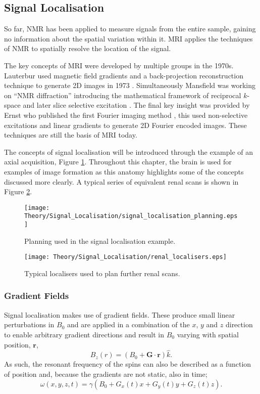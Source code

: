 \subsection{Signal Localisation}
So far, \ac{NMR} has been applied to measure signals from the entire sample, gaining no information about the spatial variation within it. \ac{MRI} applies the techniques of \ac{NMR} to spatially resolve the location of the signal.

The key concepts of \ac{MRI} were developed by multiple groups in the 1970s. Lauterbur used magnetic field gradients and a back-projection reconstruction technique to generate 2D images in 1973 \cite{lauterbur_image_1973}. Simultaneously Mansfield was working on ``\ac{NMR} diffraction'' introducing the mathematical framework of reciprocal $k$-space \cite{mansfield_nmr_1973} and later slice selective excitation \cite{garroway_image_1974}. The final key insight was provided by Ernst who published the first Fourier imaging method \cite{kumar_nmr_1975}, this used non-selective excitations and linear gradients to generate 2D Fourier encoded images. These techniques are still the basis of \ac{MRI} today.

The concepts of signal localisation will be introduced through the example of an axial acquisition, Figure \ref{fig:theory_axial_planning}. Throughout this chapter, the brain is used for examples of image formation as this anatomy highlights some of the concepts discussed more clearly. A typical series of equivalent renal scans is shown in Figure \ref{fig:theory_renal_localisers}.
\begin{figure}[H]
	\centering
	\texttt{[image: Theory/Signal\_Localisation/signal\_localisation\_planning.eps]}
	\caption{Planning used in the signal localisation example.}
	\label{fig:theory_axial_planning}	
\end{figure}

\begin{figure}[H]
	\centering
	\texttt{[image: Theory/Signal\_Localisation/renal\_localisers.eps]}
	\caption{Typical localisers used to plan further renal scans.}
	\label{fig:theory_renal_localisers}	
\end{figure}
\subsubsection{Gradient Fields}
Signal localisation makes use of gradient fields. These produce small linear perturbations in $B_0$ and are applied in a combination of the $x$, $y$ and $z$ direction to enable arbitrary gradient directions and result in $B_0$ varying with spatial position, $\mathbf{r}$,
\begin{equation}
B_z\left( r\right) =\left( B_0 + \mathbf{G \cdot r}\right) \hat{k}.
\end{equation}
As such, the resonant frequency of the spins can also be described as a function of position and, because the gradients are not static, also in time;
\begin{equation}
\omega\left( x, y, z, t \right) = \gamma \left( B_0 + G_x(t)x + G_y(t)y + G_z(t)z \right). 
\label{eq:theory_localisation_gradients}
\end{equation}

